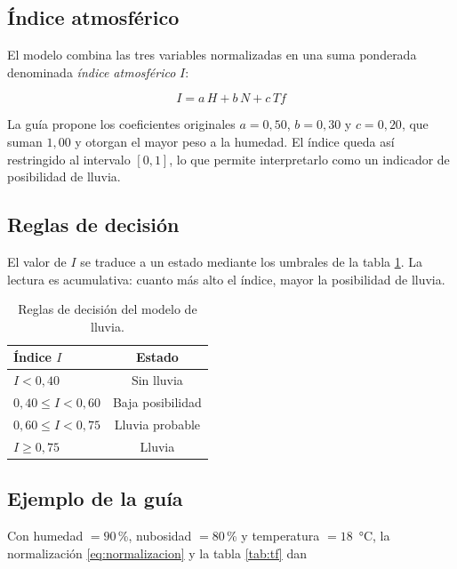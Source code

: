 \documentclass[11pt,a4paper]{article}
\begin{document}
\subsection{\'Indice atmosf\'erico}

El modelo combina las tres variables normalizadas en una suma ponderada denominada
\emph{\'indice atmosf\'erico} $I$:

\begin{equation}
I = a\,H + b\,N + c\,Tf
\label{eq:indice}
\end{equation}

La gu\'ia propone los coeficientes originales $a = 0{,}50$, $b = 0{,}30$ y
$c = 0{,}20$, que suman $1{,}00$ y otorgan el mayor peso a la humedad. El \'indice queda
as\'i restringido al intervalo $[0,1]$, lo que permite interpretarlo como un indicador de
posibilidad de lluvia.

\subsection{Reglas de decisi\'on}

El valor de $I$ se traduce a un estado mediante los umbrales de la tabla \ref{tab:reglas}.
La lectura es acumulativa: cuanto m\'as alto el \'indice, mayor la posibilidad de lluvia.

\begin{table}[htbp]
\centering
\caption{Reglas de decisi\'on del modelo de lluvia.}
\label{tab:reglas}
\small
\begin{tabular}{lc}
\toprule
\textbf{\'Indice $I$} & \textbf{Estado} \\
\midrule
$I < 0{,}40$                  & Sin lluvia \\
$0{,}40 \leq I < 0{,}60$      & Baja posibilidad \\
$0{,}60 \leq I < 0{,}75$      & Lluvia probable \\
$I \geq 0{,}75$               & Lluvia \\
\bottomrule
\end{tabular}
\end{table}

\subsection{Ejemplo de la gu\'ia}

Con humedad $= 90$\,\%, nubosidad $= 80$\,\% y temperatura $= 18$~°C, la
normalizaci\'on \eqref{eq:normalizacion} y la tabla \ref{tab:tf} dan
\end{document}
